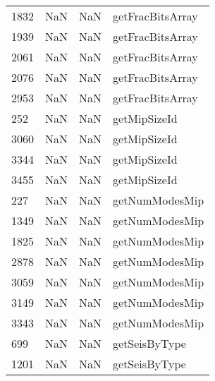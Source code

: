 \begin{tabular}{llll}
1832 &                   NaN &                        NaN &                          getFracBitsArray \\
1939 &                   NaN &                        NaN &                          getFracBitsArray \\
2061 &                   NaN &                        NaN &                          getFracBitsArray \\
2076 &                   NaN &                        NaN &                          getFracBitsArray \\
2953 &                   NaN &                        NaN &                          getFracBitsArray \\
252  &                   NaN &                        NaN &                              getMipSizeId \\
3060 &                   NaN &                        NaN &                              getMipSizeId \\
3344 &                   NaN &                        NaN &                              getMipSizeId \\
3455 &                   NaN &                        NaN &                              getMipSizeId \\
227  &                   NaN &                        NaN &                            getNumModesMip \\
1349 &                   NaN &                        NaN &                            getNumModesMip \\
1825 &                   NaN &                        NaN &                            getNumModesMip \\
2878 &                   NaN &                        NaN &                            getNumModesMip \\
3059 &                   NaN &                        NaN &                            getNumModesMip \\
3149 &                   NaN &                        NaN &                            getNumModesMip \\
3343 &                   NaN &                        NaN &                            getNumModesMip \\
699  &                   NaN &                        NaN &                             getSeisByType \\
1201 &                   NaN &                        NaN &                             getSeisByType \\

\end{tabular}
